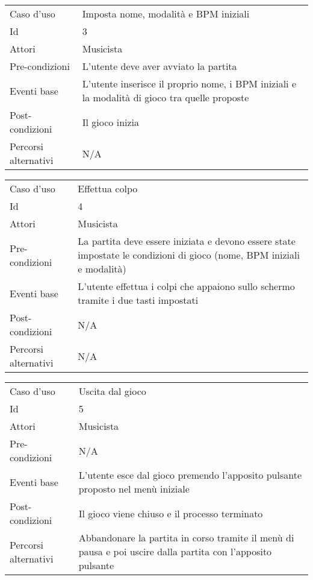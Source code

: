 \begin{center}
                \vspace{1cm}
                \begin{tabular}{ m{10em} | m{20em} }
                    Caso d'uso & Imposta nome, modalità e BPM iniziali \\
                    Id & 3 \\
                    Attori & Musicista \\
                    Pre-condizioni & L'utente deve aver avviato la partita \\
                    Eventi base & L'utente inserisce il proprio nome, i BPM iniziali e la modalità di gioco tra quelle proposte \\
                    Post-condizioni & Il gioco inizia \\
                    Percorsi alternativi & N/A \\
                \end{tabular}
                
                \vspace{2cm}
                \begin{tabular}{ m{10em} | m{20em} }
                    Caso d'uso & Effettua colpo \\
                    Id & 4 \\
                    Attori & Musicista \\
                    Pre-condizioni & La partita deve essere iniziata e devono essere state impostate le condizioni di gioco (nome, BPM iniziali e modalità) \\
                    Eventi base & L'utente effettua i colpi che appaiono sullo schermo tramite i due tasti impostati \\
                    Post-condizioni & N/A \\
                    Percorsi alternativi & N/A \\
                \end{tabular}
                
                \vspace{1cm}
                \begin{tabular}{ m{10em} | m{20em} }
                    Caso d'uso & Uscita dal gioco \\
                    Id & 5 \\
                    Attori & Musicista \\
                    Pre-condizioni & N/A \\
                    Eventi base & L'utente esce dal gioco premendo l'apposito pulsante proposto nel menù iniziale \\
                    Post-condizioni & Il gioco viene chiuso e il processo terminato \\
                    Percorsi alternativi & Abbandonare la partita in corso tramite il menù di pausa e poi uscire dalla partita con l'apposito pulsante \\
                \end{tabular}
                

\end{center}
